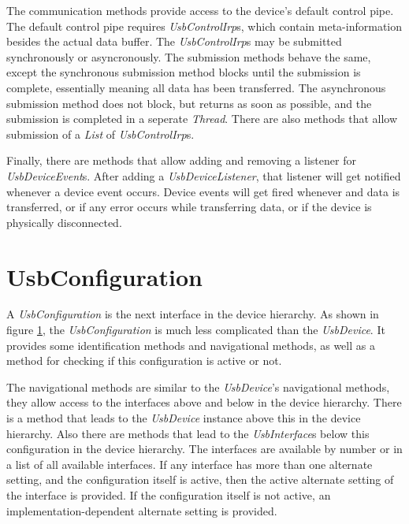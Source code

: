 \documentclass{article}
\newcommand{\myclass}[1]{\emph{#1}}
\newcommand{\myinterface}[1]{\emph{#1}}
\newcommand{\mysectionend}[0]{\vfill\pagebreak[1]}
\begin{document}
The communication methods provide access to the device's default control
pipe.  The default control pipe requires \myinterface{UsbControlIrp}s, which contain
meta-information besides the actual data buffer.  The \myinterface{UsbControlIrp}s
may be submitted synchronously or asyncronously.  The submission methods
behave the same, except the synchronous submission method blocks until
the submission is complete, essentially meaning all data has been transferred.
The asynchronous submission method does not block, but returns as soon as
possible, and the submission is completed in a seperate \myclass{Thread}.  There
are also methods that allow submission of a \myinterface{List} of \myinterface{UsbControlIrp}s.

Finally, there are methods that allow adding and removing a listener for
\myclass{UsbDeviceEvent}s.  After adding a \myinterface{UsbDeviceListener}, that listener will
get notified whenever a device event occurs.  Device events will get
fired whenever and data is transferred, or if any error occurs while
transferring data, or if the device is physically disconnected.

\mysectionend


\section{UsbConfiguration}

A \myinterface{UsbConfiguration} is the next interface in the device hierarchy.
As shown in figure \ref{UsbConfiguration}, the \myinterface{UsbConfiguration}
is much less complicated than the \myinterface{UsbDevice}.  It provides some
identification methods and navigational methods, as well as a
method for checking if this configuration is active or not.

\begin{figure}
\label{UsbConfiguration}
\end{figure}

The navigational methods are similar to the \myinterface{UsbDevice}'s navigational
methods, they allow access to the interfaces above and below in the
device hierarchy.  There is a method that leads to the \myinterface{UsbDevice}
instance above this in the device hierarchy.  Also there are methods
that lead to the \myinterface{UsbInterface}s below this configuration in the device
hierarchy.  The interfaces are available by number or in a list of all
available interfaces.  If any interface has more than one alternate
setting, and the configuration itself is active, then the active
alternate setting of the interface is provided.  If the configuration
itself is not active, an implementation-dependent alternate setting
is provided.
\end{document}
